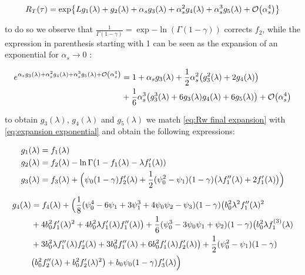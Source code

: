 \documentclass[../main.tex]{subfiles}
\begin{document}
\begin{equation}\label{eq:RT resummed}
    R_T(\tau) = \exp{L g_1(\lambda) + g_2(\lambda) + \alpha_s g_3(\lambda) + \alpha_s^2 g_4(\lambda) + \alpha_s^3 g_5(\lambda) + \order{\alpha_s^4}}
\end{equation}

to do so we observe that $\frac{1}{\Gamma(1-\gamma)}= \exp{-\ln(\Gamma(1-\gamma))}$ corrects $f_2$, while the expression in parenthesis starting with 1 can be seen 
as the expansion of an exponential for $\alpha_s \to 0$ : 

\begin{equation}
    \begin{split}\label{eq:expansion exponential}
    e^{\alpha_s g_3(\lambda) + \alpha_s^2 g_4(\lambda) + \alpha_s^3 g_5(\lambda) + \order{\alpha_s^4}} &= 1+\alpha_s g_3(\lambda)+\frac{1}{2} \alpha_s^2 \qty(g_3^2(\lambda)+2 g_4(\lambda))\\
    &+\frac{1}{6} \alpha_s^3 \qty(g_3^3(\lambda) + 6 g_3(\lambda) g_4(\lambda) + 6 g_5(\lambda))+ \order{\alpha_s^4}
    \end{split}
\end{equation}

to obtain $g_3(\lambda)$, $g_4(\lambda)$ and $g_5(\lambda)$ we match \cref{eq:Rw final expansion} with \cref{eq:expansion exponential} and obtain the following expressions:

\begin{align}
    & g_1(\lambda) = f_1(\lambda) \\
    & g_2(\lambda) = f_2(\lambda) -  \ln \Gamma(1- f_1(\lambda)- \lambda f_1'(\lambda))\\
    & g_3(\lambda) = f_3(\lambda) +   \Bigl( \psi_0(1-\gamma) f_2'(\lambda )  + \frac{1}{2} (\psi_0^2-\psi_1)(1-\gamma)\bigl( \lambda  f_1''(\lambda ) +2  f_1'(\lambda )\bigr)\Bigr)
\end{align}

\begin{align}
    \begin{split}
        g_4(\lambda) &=  f_4(\lambda) +  \Bigl(\frac{1}{8} (\psi_0^4 -6 \psi_1 + 3\psi_1^3 +4\psi_0\psi_2 -\psi_3)(1-\gamma) \bigl(b_0^2 \lambda ^2 f_1''(\lambda )^2\\
        &+4 b_0^2 f_1'(\lambda )^2 +4 b_0^2 \lambda  f_1'(\lambda ) f_1''(\lambda )\bigr)+\frac{1}{6} (\psi_0^3 -3 \psi_0\psi_1+\psi_2)(1-\gamma) \bigl(b_0^2 \lambda  f_1^{(3)}(\lambda )\\
        &+ 3 b_0^2 \lambda  f_1''(\lambda ) f_2'(\lambda )+3 b_0^2 f_1''(\lambda )+6 b_0^2 f_1'(\lambda ) f_2'(\lambda )\bigr)+\frac{1}{2} (\psi_0^2-\psi_1)(1-\gamma)\\
        &\bigl(b_0^2 f_2''(\lambda )+b_0^2 f_2'(\lambda )^2\bigr) + b_0 \psi_0(1-\gamma) f_3'(\lambda )\Bigr)
    \end{split}
\end{align}
\end{document}
